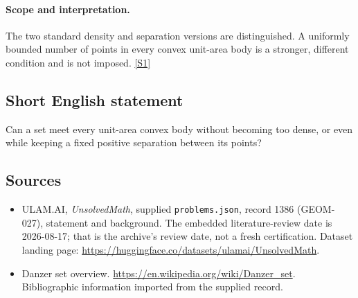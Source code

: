 \documentclass[11pt,a4paper]{article}
\newcommand{\sref}[2]{\hyperlink{source:#1:#2}{[S#2]}}
\begin{document}
\paragraph{Scope and interpretation.}

The two standard density and separation versions are distinguished. A uniformly bounded number of points in every convex unit-area body is a stronger, different condition and is not imposed. \sref{1386}{1}

\subsection{Short English statement}

Can a set meet every unit-area convex body without becoming too dense, or even while keeping a fixed positive separation between its points?

\subsection{Sources}

{\small

\begin{itemize}

\item[\hypertarget{source:1386:1}{S1}] ULAM.AI, \emph{UnsolvedMath}, supplied \texttt{problems.json}, record 1386 (GEOM-027), statement and background. The embedded literature-review date is 2026-08-17; that is the archive’s review date, not a fresh certification. Dataset landing page: \url{https://huggingface.co/datasets/ulamai/UnsolvedMath}.

\item[\hypertarget{source:1386:2}{S2}] Danzer set overview. \url{https://en.wikipedia.org/wiki/Danzer_set}. Bibliographic information imported from the supplied record.

\end{itemize}

}

\label{end:1386}
\end{document}
